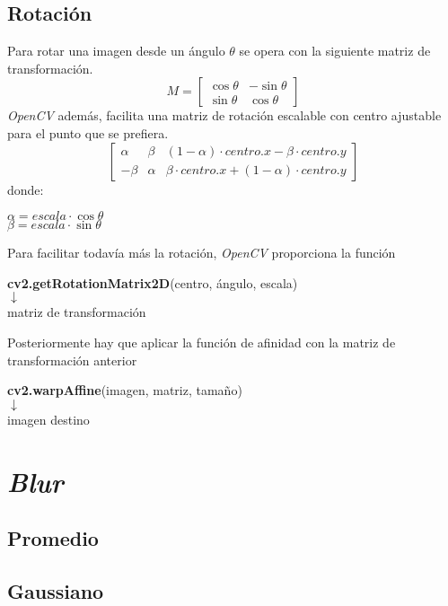 \subsection{Rotación}
Para rotar una imagen desde un ángulo $\theta$ se opera con la
siguiente matriz de transformación.
\begin{equation*}
  M =
  \begin{bmatrix}
    \cos \theta & -\sin \theta \\ \sin \theta & \cos \theta
  \end{bmatrix}
\end{equation*}
\emph{OpenCV} además, facilita una matriz de rotación escalable con
centro ajustable para el punto que se prefiera.
\begin{equation*}
  \begin{bmatrix}
    \alpha & \beta & (1 - \alpha) \cdot centro.x - \beta \cdot centro.y \\
    - \beta & \alpha & \beta \cdot centro.x + (1 - \alpha) \cdot centro.y
  \end{bmatrix}
\end{equation*}
donde:
\begin{center}
$
\alpha = escala \cdot \cos \theta
$
\\
$
\beta = escala \cdot \sin \theta
$
\end{center}
Para facilitar todavía más la rotación, \emph{OpenCV} proporciona la función
\begin{center}
\textbf{cv2.getRotationMatrix2D}(centro, ángulo, escala) \\
$\downarrow$ \\
matriz de transformación
\end{center}
Posteriormente hay que aplicar la función de afinidad con la matriz de transformación anterior \\
\begin{center}
\textbf{cv2.warpAffine}(imagen, matriz, tamaño)\\
$\downarrow$ \\
imagen destino
\end{center}
\section{\emph{Blur}}
\subsection{Promedio}
\subsection{Gaussiano}
